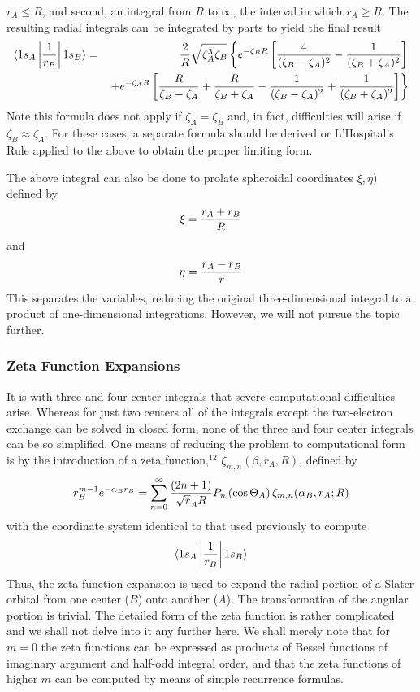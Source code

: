 $r_A \leq R$, and second, an integral from $R$ to $\infty$,
the interval in which $r_A \geq R$.  The resulting radial integrals can be
integrated by parts to yield the final result
\begin{eqnarray}
\langle 1s_A \left| {1 \over r_B} \right| 1s_B \rangle & =& {2 \over 
R} \sqrt{\zeta^3_A\zeta_B} \left\{e^{-\zeta_BR} \left[ {4 \over 
(\zeta_B-\zeta_A)^2} - {1 \over (\zeta_B+\zeta_A)^2} \right]\right.\cr
&& \left. + e^{-\zeta_AR} \left[ {R \over \zeta_B-\zeta_A}+{R \over 
\zeta_B+\zeta_A} - {1 \over (\zeta_B-\zeta_A)^2} + {1 \over 
(\zeta_B+\zeta_A)^2}\right] \right\}
\end{eqnarray}
Note this formula does not apply if $\zeta_A = \zeta_B$ and, 
in fact, difficulties will arise if $\zeta_B \approx \zeta_A$.  For 
these cases, a separate formula should be derived or L'Hospital's Rule 
applied to the above to obtain the proper limiting form.

The above integral can also be done to prolate spheroidal coordinates
$\xi , \eta)$ defined by
\begin{equation}
\xi = {r_A+r_B \over R}
\end{equation}
and
\begin{equation}
\eta = {r_A - r_B \over r}
\end{equation}
This separates the variables, reducing the original three-dimensional 
integral to a product of one-dimensional integrations.  However, we will 
not pursue the topic further.

\subsubsection{Zeta Function Expansions}

It is with three and four center integrals that severe computational
difficulties arise. Whereas for just two centers all of the integrals except
the two-electron exchange can be solved in closed form, none of the three
and four center integrals can be so simplified.  One means of reducing the
problem to computational form is by the introduction of a zeta 
function,$^{12}$ $\zeta_{m,n}(\beta , r_A , R)$, defined by
\begin{equation}
r^{m-1}_B e^{-\alpha_Br_B} = \sum^{\infty}_{n=0} {(2n+1) \over 
\sqrt{r}_AR} P_n \left( \cos \Theta_A \right) \zeta_{m,n} ( \alpha_B, 
r_A; R)
\end{equation}
with the coordinate system identical to that used previously to compute
\begin{equation}
\langle 1s_A \left| {1 \over r_B} \right| 1s_B \rangle
\end{equation}
Thus, the zeta function expansion is used to expand the radial portion of
a Slater orbital from one center ($B$) onto another ($A$).  The transformation
of the angular portion is trivial.  The detailed form of the zeta function is
rather complicated and we shall not delve into it any further here.  We shall
merely note that for $m = 0$ the zeta functions can be expressed as products
of Bessel functions of imaginary argument and half-odd integral order, and
that the zeta functions of higher $m$ can be computed by means of simple
recurrence formulas.

